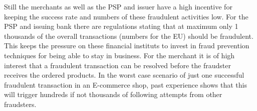 Still the merchants as well as the \gls{PSP} and issuer have a high incentive for keeping the success rate and numbers of these fraudulent activities low. For the \gls{PSP} and issuing bank there are regulations stating that at maximum only 1 thousands of the overall transactions (numbers for the EU) should be fraudulent. This keeps the pressure on these financial instituts to invest in fraud prevention techniques for being able to stay in business. For the merchant it is of high interest that a fraudulent transaction can be resolved before the fraudster receives the ordered products. In the worst case scenario of just one successful fraudulent transaction in an E-commerce shop, past experience shows that this will trigger hundreds if not thousands of following attempts from other fraudsters. \\


